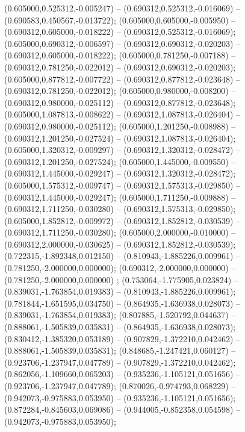  (0.605000,0.525312,-0.005247) -- (0.690312,0.525312,-0.016069) -- (0.690583,0.450567,-0.013722);
 (0.605000,0.605000,-0.005950) -- (0.690312,0.605000,-0.018222) -- (0.690312,0.525312,-0.016069);
 (0.605000,0.690312,-0.006597) -- (0.690312,0.690312,-0.020203) -- (0.690312,0.605000,-0.018222);
 (0.605000,0.781250,-0.007188) -- (0.690312,0.781250,-0.022012) -- (0.690312,0.690312,-0.020203);
 (0.605000,0.877812,-0.007722) -- (0.690312,0.877812,-0.023648) -- (0.690312,0.781250,-0.022012);
 (0.605000,0.980000,-0.008200) -- (0.690312,0.980000,-0.025112) -- (0.690312,0.877812,-0.023648);
 (0.605000,1.087813,-0.008622) -- (0.690312,1.087813,-0.026404) -- (0.690312,0.980000,-0.025112);
 (0.605000,1.201250,-0.008988) -- (0.690312,1.201250,-0.027524) -- (0.690312,1.087813,-0.026404);
 (0.605000,1.320312,-0.009297) -- (0.690312,1.320312,-0.028472) -- (0.690312,1.201250,-0.027524);
 (0.605000,1.445000,-0.009550) -- (0.690312,1.445000,-0.029247) -- (0.690312,1.320312,-0.028472);
 (0.605000,1.575312,-0.009747) -- (0.690312,1.575313,-0.029850) -- (0.690312,1.445000,-0.029247);
 (0.605000,1.711250,-0.009888) -- (0.690312,1.711250,-0.030280) -- (0.690312,1.575313,-0.029850);
 (0.605000,1.852812,-0.009972) -- (0.690312,1.852812,-0.030539) -- (0.690312,1.711250,-0.030280);
 (0.605000,2.000000,-0.010000) -- (0.690312,2.000000,-0.030625) -- (0.690312,1.852812,-0.030539);
 (0.722315,-1.892348,0.012150) -- (0.810943,-1.885226,0.009961) -- (0.781250,-2.000000,0.000000);
 (0.690312,-2.000000,0.000000) -- (0.781250,-2.000000,0.000000) ;
 (0.753064,-1.775905,0.023824) -- (0.839031,-1.763854,0.019383) -- (0.810943,-1.885226,0.009961);
 (0.781844,-1.651595,0.034750) -- (0.864935,-1.636938,0.028073) -- (0.839031,-1.763854,0.019383);
 (0.807885,-1.520792,0.044637) -- (0.888061,-1.505839,0.035831) -- (0.864935,-1.636938,0.028073);
 (0.830412,-1.385320,0.053189) -- (0.907829,-1.372210,0.042462) -- (0.888061,-1.505839,0.035831);
 (0.848685,-1.247421,0.060127) -- (0.923706,-1.237947,0.047789) -- (0.907829,-1.372210,0.042462);
 (0.862056,-1.109660,0.065203) -- (0.935236,-1.105121,0.051656) -- (0.923706,-1.237947,0.047789);
 (0.870026,-0.974793,0.068229) -- (0.942073,-0.975883,0.053950) -- (0.935236,-1.105121,0.051656);
 (0.872284,-0.845603,0.069086) -- (0.944005,-0.852358,0.054598) -- (0.942073,-0.975883,0.053950);
